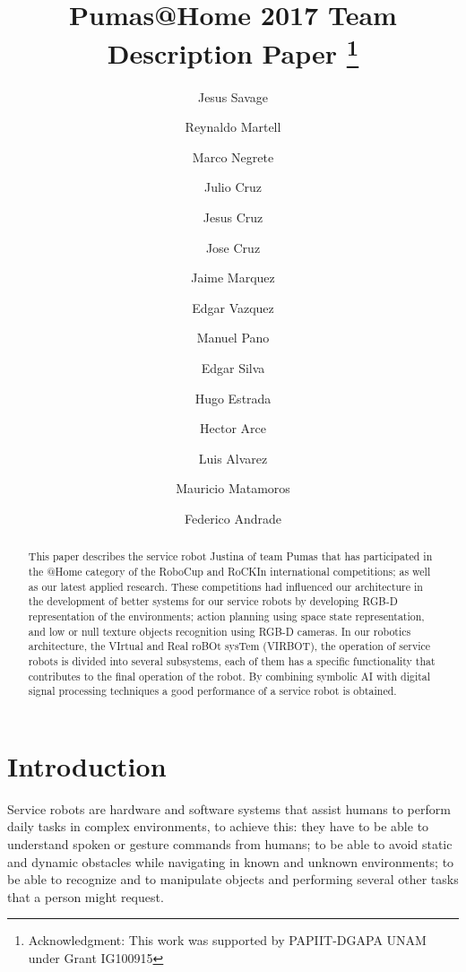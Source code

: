 \documentclass{llncs}
\begin{document}
\title{Pumas@Home 2017 Team Description Paper
\thanks{Acknowledgment: This work was supported by PAPIIT-DGAPA UNAM under Grant IG100915}}
\author{
	Jesus Savage 
	\and Reynaldo Martell 
	\and Marco Negrete 
	\and Julio Cruz 
	\and Jesus Cruz
	\and Jose Cruz
	\and Jaime Marquez 
	\and Edgar Vazquez
	\and Manuel Pano 
	\and Edgar Silva
	\and Hugo Estrada 
	\and Hector Arce 
	\and Luis Alvarez
	\and Mauricio Matamoros
	\and Federico Andrade
}
\maketitle


\begin{abstract}

This paper describes the service robot Justina of team Pumas that has participated in the @Home category of the RoboCup and RoCKIn
international competitions; as well as our latest applied research. These competitions had influenced our architecture
in the development of better systems for our service robots by developing RGB-D representation of the environments; action
planning using space state representation, and low or null texture objects recognition using RGB-D cameras. 
In our robotics architecture, the VIrtual and Real roBOt sysTem (VIRBOT), the operation of service robots is divided into
several subsystems, each of them has a specific functionality  that contributes to the final operation of the robot.
By combining symbolic AI with digital signal processing techniques a good performance of a service robot is obtained.

\end{abstract}


\section{Introduction}

Service robots are hardware and software systems that assist humans to perform daily tasks in complex environments, to achieve this: 
they have to be able to understand spoken or gesture commands from humans;  to be able to avoid static and
dynamic obstacles while navigating in known and unknown environments; to be able to recognize and to manipulate objects and performing 
several other tasks that a person might request. 
\end{document}
